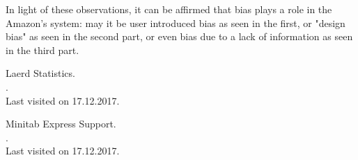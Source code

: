 \documentclass[11pt]{article}
\begin{document}
In light of these observations, it can be affirmed that bias plays a role in the Amazon's system: may it be user introduced bias as seen in the first, or "design bias" as seen in the second part, or even bias due to a lack of information as seen in the third part.


\begin{thebibliography}{}

 Laerd Statistics.\\
.\\
\newblock Last visited on 17.12.2017.

Minitab Express Support.\\
.\\
\newblock Last visited on 17.12.2017.

\end{thebibliography}
\end{document}
